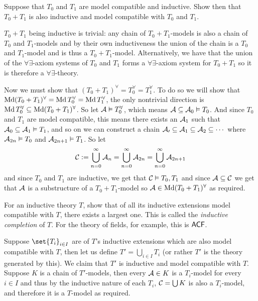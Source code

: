 \bexerc

    Suppose that $T_0$ and $T_1$ are model compatible and inductive.
    Show then that $T_0+T_1$ is also inductive and model compatible with $T_0$ and $T_1$.

\eexerc

$T_0+T_1$ being inductive is trivial: any chain of $T_0+T_1$-models is also a chain of $T_0$ and $T_1$-models and by their own inductiveness the union of the chain is a $T_0$ and $T_1$-model and is thus
a $T_0+T_1$-model.
Alternatively, we have that the union of the $\forall\exists$-axiom systems of $T_0$ and $T_1$ forms a $\forall\exists$-axiom system for $T_0+T_1$ so it is therefore a $\forall\exists$-theory.

Now we must show that $(T_0+T_1)^\forall=T_0^\forall=T_1^\forall$.
To do so we will show that $\Md(T_0+T_1)^\forall=\Md T_0^\forall=\Md T_1^\forall$, the only nontrivial direction is $\Md T_0^\forall\subseteq\Md(T_0+T_1)^\forall$.
So let ${\cal A}\vDash T_0^\forall$, which means ${\cal A}\subseteq{\cal A}_0\vDash T_0$.
And since $T_0$ and $T_1$ are model compatible, this means there exists an ${\cal A}_1$ such that ${\cal A}_0\subseteq{\cal A}_1\vDash T_1$, and so on we can construct a chain
${\cal A_0}\subseteq{\cal A}_1\subseteq{\cal A}_2\subseteq\cdots$ where ${\cal A}_{2n}\vDash T_0$ and ${\cal A}_{2n+1}\vDash T_1$.
So let
$$ {\cal C}\coloneqq\bigcup_{n=0}^\infty{\cal A}_n = \bigcup_{n=0}^\infty{\cal A}_{2n} = \bigcup_{n=0}^\infty{\cal A}_{2n+1} $$
and since $T_0$ and $T_1$ are inductive, we get that ${\cal C}\vDash T_0,T_1$ and since ${\cal A}\subseteq{\cal C}$ we get that ${\cal A}$ is a substructure of a $T_0+T_1$-model so
${\cal A}\in\Md(T_0+T_1)^\forall$ as required.

\bexerc

    For an inductive theory $T$, show that of all its inductive extensions model compatible with $T$, there exists a largest one.
    This is called the {\it inductive completion} of $T$.
    For the theory of fields, for example, this is ${\sf ACF}$.

\eexerc

Suppose $\set{T_i}_{i\in I}$ are of $T$'s inductive extensions which are also model compatible with $T$, then let us define $T'=\bigcup_{i\in I}T_i$ (or rather $T'$ is the theory generated by this).
We claim that $T'$ is inductive and model compatible with $T$.
Suppose $K$ is a chain of $T'$-models, then every ${\cal A}\in K$ is a $T_i$-model for every $i\in I$ and thus by the inductive nature of each $T_i$, ${\cal C}=\bigcup K$ is also a $T_i$-model, and therefore
it is a $T$-model as required.

